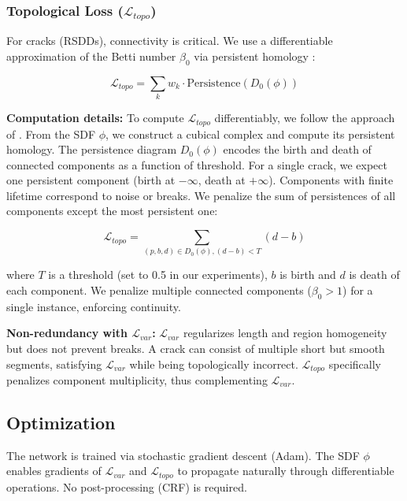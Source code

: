 \documentclass[12pt, a4paper]{article}
\newcommand{\calL}{\mathcal{L}}
\begin{document}
\subsubsection{Topological Loss ($\calL_{topo}$)}

For cracks (RSDDs), connectivity is critical. We use a differentiable approximation of the Betti number $\beta_0$ via persistent homology \cite{kafer2020topological}:

\begin{equation}
\calL_{topo} = \sum_{k} w_k \cdot \text{Persistence}(D_0(\phi))
\label{eq:topo_loss}
\end{equation}

\textbf{Computation details:} To compute $\calL_{topo}$ differentiably, we follow the approach of \cite{topoloss2020}. From the SDF $\phi$, we construct a cubical complex and compute its persistent homology. The persistence diagram $D_0(\phi)$ encodes the birth and death of connected components as a function of threshold. For a single crack, we expect one persistent component (birth at $-\infty$, death at $+\infty$). Components with finite lifetime correspond to noise or breaks. We penalize the sum of persistences of all components except the most persistent one:

\begin{equation}
\calL_{topo} = \sum_{(p,b,d) \in D_0(\phi), (d-b) < T} (d-b)
\label{eq:topo_loss_detail}
\end{equation}

where $T$ is a threshold (set to 0.5 in our experiments), $b$ is birth and $d$ is death of each component. We penalize multiple connected components ($\beta_0 > 1$) for a single instance, enforcing continuity.

\textbf{Non-redundancy with $\calL_{var}$:} $\calL_{var}$ regularizes length and region homogeneity but does not prevent breaks. A crack can consist of multiple short but smooth segments, satisfying $\calL_{var}$ while being topologically incorrect. $\calL_{topo}$ specifically penalizes component multiplicity, thus complementing $\calL_{var}$.

\subsection{Optimization}
\label{subsec:optimization}

The network is trained via stochastic gradient descent (Adam). The SDF $\phi$ enables gradients of $\calL_{var}$ and $\calL_{topo}$ to propagate naturally through differentiable operations. No post-processing (CRF) is required.
\end{document}
